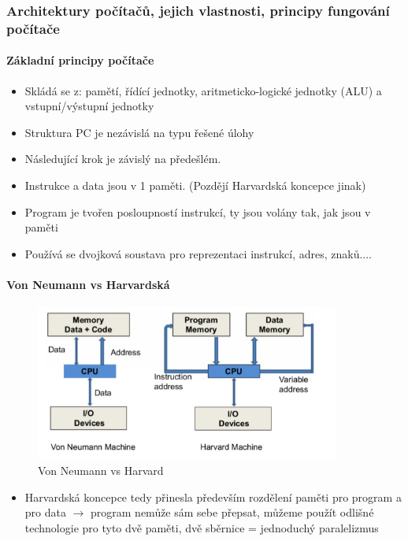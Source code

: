 \documentclass[10pt,a4paper]{article}
\begin{document}
\subsubsection{Architektury počítačů, jejich vlastnosti, principy fungování počítače}
\paragraph{Základní principy počítače}
\begin{itemize}
\item Skládá se z: pamětí, řídící jednotky, aritmeticko-logické jednotky (ALU) a vstupní/výstupní jednotky
\item Struktura PC je nezávislá na typu řešené úlohy
\item Následující krok je závislý na předešlém.
\item Instrukce a data jsou v 1 paměti. (Pozdějí Harvardská koncepce jinak)
\item Program je tvořen posloupností instrukcí, ty jsou volány tak, jak jsou v paměti
\item Používá se dvojková soustava pro reprezentaci instrukcí, adres, znaků....
\end{itemize}

\paragraph{ Von Neumann vs Harvardská}

\begin{figure}[ht]
    \centering
    \includegraphics[width=10cm]{app_monolit-arch.png}
    \caption{Von Neumann vs Harvard}
    \label{fig:app_monolit-arch}
\end{figure}
\begin{itemize}
    \item Harvardská koncepce tedy přinesla především rozdělení paměti pro program a pro data $\rightarrow$ program nemůže sám sebe přepsat, můžeme použít odlišné technologie pro tyto dvě paměti, dvě sběrnice = jednoduchý paralelizmus
\end{itemize}
\end{document}
